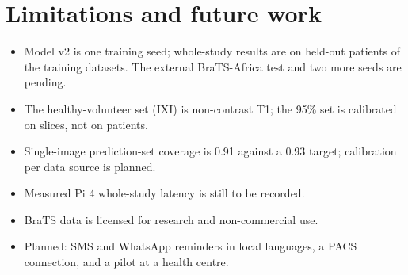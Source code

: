 \documentclass[11pt,a4paper]{article}
\begin{document}
\section{Limitations and future work}
\begin{itemize}
\item Model v2 is one training seed; whole-study results are on held-out patients of the training datasets. The
external BraTS-Africa test and two more seeds are pending.
\item The healthy-volunteer set (IXI) is non-contrast T1; the 95\% set is calibrated on slices, not on patients.
\item Single-image prediction-set coverage is 0.91 against a 0.93 target; calibration per data source is planned.
\item Measured Pi 4 whole-study latency is still to be recorded.
\item BraTS data is licensed for research and non-commercial use.
\item Planned: SMS and WhatsApp reminders in local languages, a PACS connection, and a pilot at a health centre.
\end{itemize}
\end{document}
